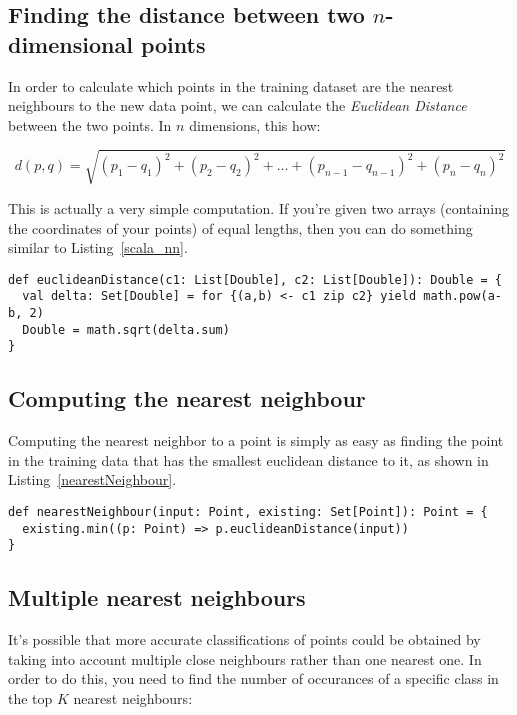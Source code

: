 \subsection{Finding the distance between two $n$-dimensional points}

In order to calculate which points in the training dataset are the nearest
neighbours to the new data point, we can calculate the {\it Euclidean Distance}
between the two points. In $n$ dimensions, this how:

\[
  d(p,q) = \sqrt{(p_1 - q_1)^2 + (p_2 - q_2)^2 + \dots + (p_{n-1} - q_{n-1})^2 + (p_n - q_n)^2}
\]

This is actually a very simple computation. If you're given two arrays
(containing the coordinates of your points) of equal lengths, then you can do
something similar to Listing~\ref{scala_nn}.

\begin{lstlisting}[label=scala_nn, caption=Scala Euclidean Distance]
def euclideanDistance(c1: List[Double], c2: List[Double]): Double = {
  val delta: Set[Double] = for {(a,b) <- c1 zip c2} yield math.pow(a-b, 2)
  Double = math.sqrt(delta.sum)
}
\end{lstlisting}

\subsection{Computing the nearest neighbour}

Computing the nearest neighbor to a point is simply as easy as finding the point
in the training data that has the smallest euclidean distance to it, as shown in
Listing~\ref{nearestNeighbour}.

\begin{lstlisting}[label=nearestNeighbour, caption=Scala Nearest Neighbour]
def nearestNeighbour(input: Point, existing: Set[Point]): Point = {
  existing.min((p: Point) => p.euclideanDistance(input))
}
\end{lstlisting}


\subsection{Multiple nearest neighbours}

It's possible that more accurate classifications of points could be obtained by
taking into account multiple close neighbours rather than one nearest one. In
order to do this, you need to find the number of occurances of a specific class
in the top $K$ nearest neighbours:


